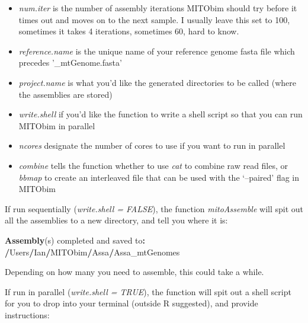 \documentclass[
]{article}
\newenvironment{Shaded}{\begin{snugshade}}{\end{snugshade}}
\newcommand{\ErrorTok}[1]{\textcolor[rgb]{0.64,0.00,0.00}{\textbf{#1}}}
\newcommand{\KeywordTok}[1]{\textcolor[rgb]{0.13,0.29,0.53}{\textbf{#1}}}
\newcommand{\NormalTok}[1]{#1}
\newcommand{\OperatorTok}[1]{\textcolor[rgb]{0.81,0.36,0.00}{\textbf{#1}}}
\newcommand{\StringTok}[1]{\textcolor[rgb]{0.31,0.60,0.02}{#1}}
\providecommand{\tightlist}{%
  \setlength{\itemsep}{0pt}\setlength{\parskip}{0pt}}
\begin{document}
\begin{itemize}
\tightlist
\item
  \emph{num.iter} is the number of assembly iterations MITObim should
  try before it times out and moves on to the next sample. I usually
  leave this set to 100, sometimes it takes 4 iterations, sometimes 60,
  hard to know.\\
\item
  \emph{reference.name} is the unique name of your reference genome
  fasta file which precedes '\_mtGenome.fasta'\\
\item
  \emph{project.name} is what you'd like the generated directories to be
  called (where the assemblies are stored)
\item
  \emph{write.shell} if you'd like the function to write a shell script
  so that you can run MITObim in parallel
\item
  \emph{ncores} designate the number of cores to use if you want to run
  in parallel
\item
  \emph{combine} tells the function whether to use \emph{cat} to combine
  raw read files, or \emph{bbmap} to create an interleaved file that can
  be used with the `--paired' flag in MITObim
\end{itemize}

If run sequentially (\emph{write.shell = FALSE}), the function
\emph{mitoAssemble} will spit out all the assemblies to a new directory,
and tell you where it is:

\begin{Shaded}
\begin{Highlighting}[]
\KeywordTok{Assembly}\NormalTok{(s) completed and saved to}\OperatorTok{:}\StringTok{ }\ErrorTok{/}\NormalTok{Users}\OperatorTok{/}\NormalTok{Ian}\OperatorTok{/}\NormalTok{MITObim}\OperatorTok{/}\NormalTok{Assa}\OperatorTok{/}\NormalTok{Assa\_mtGenomes}
\end{Highlighting}
\end{Shaded}

Depending on how many you need to assemble, this could take a while.

If run in parallel (\emph{write.shell = TRUE}), the function will spit
out a shell script for you to drop into your terminal (outside R
suggested), and provide instructions:
\end{document}
